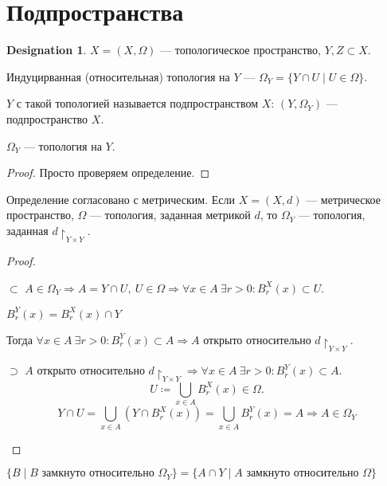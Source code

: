 \documentclass[11pt]{book}
\theoremstyle{definition}
\theoremstyle{plain}
\theoremstyle{plain}
\theoremstyle{definition}
\newtheorem*{name}{Designation}
\theoremstyle{remark}
\begin{document}
\section{Подпространства}
\begin{name}
    $ X = (X, \Omega )$ --- топологическое пространство, $ Y, Z \subset X$.
\end{name}
\begin{defn}
    Индуцирванная (относительная) топология на $ Y$ ---  $ \Omega _Y = \{Y \cap U\mid U \in \Omega \}$.

    $ Y$ с такой топологией называется подпространством $ X$:  $ (Y, \Omega _Y)$ --- подпространство $ X$.
\end{defn}
\begin{thm}
    $ \Omega _Y$ --- топология на $ Y$.
\end{thm}
\begin{proof}
    Просто проверяем определение.
\end{proof}
\begin{thm}
    Определение согласовано с метрическим. Если $ X = (X, d)$ ---  метрическое пространство, $ \Omega $ --- топология, заданная метрикой $ d$, то  $ \Omega _Y$ --- топология, заданная $ d\!\!\upharpoonright_{Y\times Y}$.
\end{thm}
\begin{proof}
    $ $
    \begin{description}
	\item $ \boxed{\subset }$ $ A \in \Omega _Y \Longrightarrow A = Y \cap U, ~ U \in  \Omega \Longrightarrow \forall x \in A ~\exists r >0 : B_r^{X}(x) \subset U$.

	    $ B_r^{Y}(x) = B_r^{X}(x) \cap Y$

	    Тогда $ \forall x \in A ~ \exists r >0 : B_r^{Y}(x) \subset  A \Longrightarrow A \text{ открыто относительно } d\!\upharpoonright_{Y\times Y}$.
	\item $\boxed{\supset}$  $ A \text{ открыто относительно } d\!\upharpoonright_{Y\times Y} \Longrightarrow \forall x \in A ~ \exists r >0 : B_r^{Y}(x) \subset A$.
	    \[
		U \coloneqq \bigcup_{x \in A}  B_r^{X}(x) \in \Omega
	    .\]
	    $$
	    Y \cap U = \bigcup_{x \in A} (Y \cap B_r^{X}(x)) = \bigcup_{x \in A} B_r^{Y}(x) = A \Longrightarrow A \in \Omega _Y
	    $$
    \end{description}
\end{proof}
\begin{thm}
    $ \{B \mid B  \text{ замкнуто относительно }  \Omega _Y\} = \{A \cap Y \mid A  \text{ замкнуто относительно } \Omega \}$
\end{thm}
\end{document}
